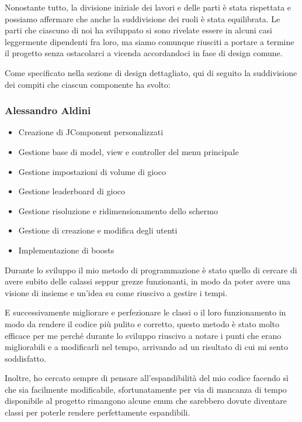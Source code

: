 \documentclass[a4paper,12pt]{report}
\begin{document}
Nonostante tutto, la divisione iniziale dei lavori e delle parti è stata rispettata e possiamo affermare che anche la suddivisione dei ruoli è stata equilibrata. Le parti che
ciascuno di noi ha sviluppato si sono rivelate essere in alcuni casi leggermente dipendenti fra loro, ma siamo comunque riusciti a portare a termine il progetto senza ostacolarci a vicenda accordandoci in fase di design comune.

Come specificato nella sezione di design dettagliato, qui di seguito la
suddivisione dei compiti che ciascun componente ha svolto:

\subsubsection{Alessandro Aldini}

\begin{itemize}
    \item Creazione di JComponent personalizzati 
    \item Gestione base di model, view e controller del menu principale 
    \item Gestione impostazioni di volume di gioco 
    \item Gestione leaderboard di gioco 
    \item Gestione risoluzione e ridimensionamento dello schermo 
    \item Gestione di creazione e modifica degli utenti 
    \item Implementazione di boosts 
\end{itemize}

Durante lo sviluppo il mio metodo di programmazione è stato quello di cercare di avere subito delle calassi seppur grezze funzionanti, in modo da poter avere una visione di insieme e un’idea su come riuscivo a gestire i tempi. 

E successivamente migliorare e perfezionare le classi o il loro funzionamento in modo da rendere il codice più pulito e corretto, questo metodo è stato molto efficace per me perché durante lo sviluppo riuscivo a notare i punti che erano migliorabili e a modificarli nel tempo, arrivando ad un risultato di cui mi sento soddisfatto. 

Inoltre, ho cercato sempre di pensare all’espandibilità del mio codice facendo sì che sia facilmente modificabile, sfortunatamente per via di mancanza di tempo disponibile al progetto rimangono alcune enum che sarebbero dovute diventare classi per poterle rendere perfettamente espandibili. 
\end{document}
